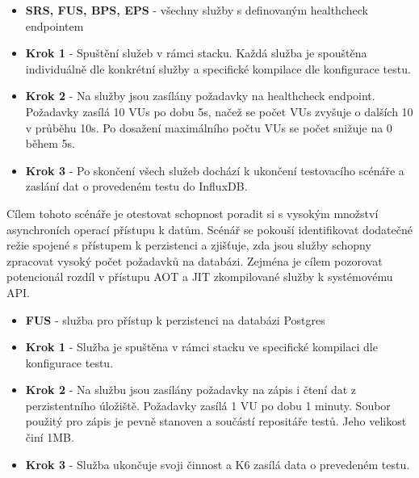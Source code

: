 

\begin{itemize}
    \item \textbf{SRS, FUS, BPS, EPS} - všechny služby s definovaným healthcheck endpointem
\end{itemize}


\begin{itemize}
    \item \textbf{Krok 1} - Spuštění služeb v rámci stacku. Každá služba je spouštěna individuálně dle konkrétní služby a specifické kompilace dle konfigurace testu.
    \item \textbf{Krok 2} - Na služby jsou zasílány požadavky na healthcheck endpoint. Požadavky zasílá 10 VUs po dobu 5s, načež se počet VUs zvyšuje o dalších 10 v průběhu 10s. Po dosažení maximálního počtu VUs se počet snižuje na 0 během 5s.
    \item \textbf{Krok 3} - Po skončení všech služeb dochází k ukončení testovacího scénáře a zaslání dat o provedeném testu do InfluxDB.
\end{itemize}


Cílem tohoto scénáře je otestovat schopnost poradit si s vysokým množství asynchroních operací přístupu k datům. Scénář se pokouší identifikovat dodatečné režie spojené s přístupem k perzistenci a zjišťuje, zda jsou služby schopny zpracovat vysoký počet požadavků na databázi. Zejména je cílem pozorovat potencionál rozdíl v přístupu AOT a JIT zkompilované služby k systémovému API.



\begin{itemize}
    \item \textbf{FUS} - služba pro přístup k perzistenci na databázi Postgres
\end{itemize}


\begin{itemize}
    \item \textbf{Krok 1} - Služba je spuštěna v rámci stacku ve specifické kompilaci dle konfigurace testu.
    \item \textbf{Krok 2} - Na službu jsou zasílány požadavky na zápis i čtení dat z perzistentního úložiště. Požadavky zasílá 1 VU po dobu 1 minuty. Soubor použitý pro zápis je pevně stanoven a součástí repositáře testů. Jeho velikost činí 1MB.
    \item \textbf{Krok 3} - Služba ukončuje svoji činnost a K6 zasílá data o prevedeném testu.
\end{itemize}

